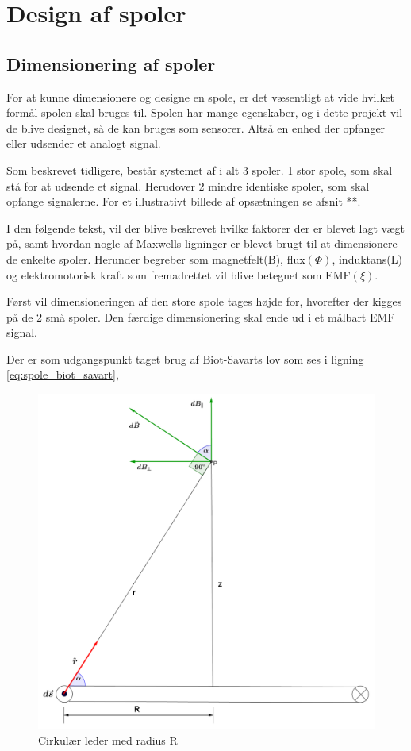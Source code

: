 \section{Design af spoler}\label{sec:sec_spole_design}

\subsection{Dimensionering af spoler}

For at kunne dimensionere og designe en spole, er det væsentligt at vide hvilket formål spolen skal bruges til. Spolen har mange egenskaber, og i dette projekt vil de blive designet, så de kan bruges som sensorer. Altså en enhed der opfanger eller udsender et analogt signal. 

Som beskrevet tidligere, består systemet af i alt 3 spoler. 1 stor spole, som skal stå for at udsende et signal. Herudover 2 mindre identiske spoler, som skal opfange signalerne. For et illustrativt billede af opsætningen se afsnit **.

I den følgende tekst, vil der blive beskrevet hvilke faktorer der er blevet lagt vægt på, samt hvordan nogle af Maxwells ligninger er blevet brugt til at dimensionere de enkelte spoler. Herunder begreber som magnetfelt(B), flux$(\Phi)$, induktans(L) og elektromotorisk kraft som fremadrettet vil blive betegnet som EMF$(\xi)$. 

Først vil dimensioneringen af den store spole tages højde for, hvorefter der kigges på de 2 små spoler.
Den færdige dimensionering skal ende ud i et målbart EMF signal.

Der er som udgangspunkt taget brug af Biot-Savarts lov som ses i ligning \ref{eq:spole_biot_savart}, 


\begin{figure}[h!]
	\centering
	\includegraphics[width=.6\textwidth]{billeder/B_felt.png}
	\caption{Cirkulær leder med radius R}
	\label{fig:spole_fig1}
\end{figure}


